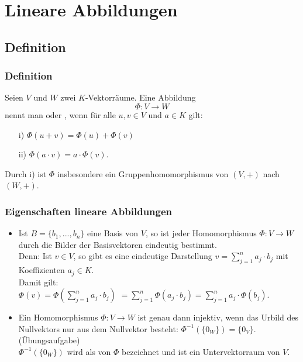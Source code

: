 \section{Lineare Abbildungen}
%
\subsection{Definition}
\makeSectionDividerPage
%
\begin{frame}\frametitle{Definition}

	Seien $V$ und $W$ zwei $K$-Vektorräume.
	Eine Abbildung
	$$
		\Phi: V \to W
	$$ 
	nennt man  oder , 
	wenn für alle $u,v \in V$ und $a\in K$ gilt:
	\begin{itemize}
		\item[i)] $\Phi(u+v)		= \Phi(u) + \Phi(v)$
		\item[ii)] $\Phi(a\cdot v)	= a\cdot \Phi(v).$
	\end{itemize}
	
	\pause
	\vspace{10mm}
	Durch i) ist $\Phi$ insbesondere ein Gruppenhomomorphismus von $(V,+)$ nach $(W,+)$.
	
\end{frame}
%
\begin{frame}\frametitle{Eigenschaften lineare Abbildungen}
\begin{itemize}
\item Ist $B=\{b_1,...,b_n\}$ eine Basis von $V$, so ist jeder Homomorphismus $\Phi: V \to W$ durch die Bilder der Basisvektoren eindeutig bestimmt.\\\pause 
Denn: Ist $v\in V$, so gibt es eine eindeutige Darstellung $v=\sum_{j=1}^n a_j\cdot b_j$ mit Koeffizienten $a_j \in K$.\\\pause
Damit gilt:\\ $\Phi(v)$\pause$=\Phi(\sum_{j=1}^n a_j\cdot b_j)$ \pause$=\sum_{j=1}^n \Phi(a_j\cdot b_j)$\pause$=\sum_{j=1}^n a_j\cdot \Phi(b_j)$.\pause
\vfill
\item Ein Homomorphismus $\Phi: V \to W$ ist genau dann injektiv, wenn das Urbild des Nullvektors nur aus dem Nullvektor besteht: $\Phi^{-1}(\{0_W\})=\{0_V\}$. \qquad (Übungsaufgabe)\\\pause
$\Phi^{-1}(\{0_W\})$ wird als  von $\Phi$ bezeichnet und ist ein Untervektorraum von $V$.
\end{itemize}
\end{frame}
%
